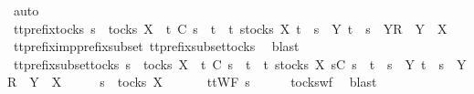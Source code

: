 \begin{isabellebody}
\ auto\isanewline
{}\isamarkupfalse%
%
\endisatagproof
{\isafoldproof}%
%
\isadelimproof
\isanewline
%
\endisadelimproof
\isanewline
{}\isamarkupfalse%
\ tt{\isacharunderscore}prefix{\isacharunderscore}tocks{\isacharcolon}\ {\isachardoublequoteopen}s\ {\isasymin}\ tocks\ X\ {\isasymLongrightarrow}\ t\ {\isasymle}\isactrlsub C\ s\ {\isasymLongrightarrow}\ t\ {\isasymin}\ {\isacharbraceleft}t{\isachardot}\ {\isasymexists}s{\isasymin}tocks\ X{\isachardot}\ t\ {\isacharequal}\ s\ {\isasymor}\ {\isacharparenleft}{\isasymexists}Y{\isachardot}\ t\ {\isacharequal}\ s\ {\isacharat}\ {\isacharbrackleft}{\isacharbrackleft}Y{\isacharbrackright}\isactrlsub R{\isacharbrackright}\ {\isasymand}\ Y\ {\isasymsubseteq}\ X{\isacharparenright}{\isacharbraceright}{\isachardoublequoteclose}\isanewline
%
\isadelimproof
\ \ %
\endisadelimproof
%
\isatagproof
{}\isamarkupfalse%
\ tt{\isacharunderscore}prefix{\isacharunderscore}imp{\isacharunderscore}prefix{\isacharunderscore}subset\ tt{\isacharunderscore}prefix{\isacharunderscore}subset{\isacharunderscore}tocks\ \isamarkupfalse%
\ blast%
\endisatagproof
{\isafoldproof}%
%
\isadelimproof
\isanewline
%
\endisadelimproof
\isanewline
{}\isamarkupfalse%
\ tt{\isacharunderscore}prefix{\isacharunderscore}subset{\isacharunderscore}tocks{}{\isacharcolon}\ {\isachardoublequoteopen}s\ {\isasymin}\ tocks\ X\ {\isasymLongrightarrow}\ t\ {\isasymlesssim}\isactrlsub C\ s\ {\isasymLongrightarrow}\ t\ {\isasymin}\ {\isacharbraceleft}t{\isachardot}\ {\isasymexists}s{\isacharprime}{\isasymin}tocks\ X{\isachardot}\ s{\isacharprime}{\isasymlesssim}\isactrlsub C\ s\ {\isasymand}\ {\isacharparenleft}t\ {\isacharequal}\ s{\isacharprime}\ {\isasymor}\ {\isacharparenleft}{\isasymexists}Y{\isachardot}\ t\ {\isacharequal}\ s{\isacharprime}\ {\isacharat}\ {\isacharbrackleft}{\isacharbrackleft}Y{\isacharbrackright}\isactrlsub R{\isacharbrackright}\ {\isasymand}\ Y\ {\isasymsubseteq}\ X{\isacharparenright}{\isacharparenright}{\isacharbraceright}{\isachardoublequoteclose}\isanewline
%
\isadelimproof
%
\endisadelimproof
%
\isatagproof
{}\isamarkupfalse%
\ {\isacharminus}\isanewline
\ \ \isamarkupfalse%
\ {\isachardoublequoteopen}s\ {\isasymin}\ tocks\ X{\isachardoublequoteclose}\ \isanewline
\ \ \isamarkupfalse%
\ \isamarkupfalse%
\ {\isachardoublequoteopen}ttWF\ s{\isachardoublequoteclose}\isanewline
\ \ \ \ \isamarkupfalse%
\ tocks{\isacharunderscore}wf\ \isamarkupfalse%
\ blast\isanewline

\end{isabellebody}
